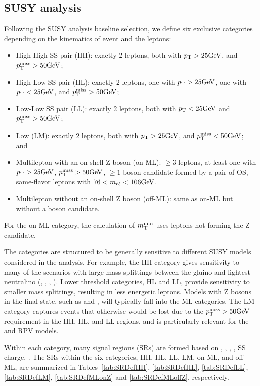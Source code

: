 \subsection{SUSY analysis}

Following the SUSY analysis baseline selection, we define 
six exclusive categories depending on the kinematics of event and the leptons:
\begin{itemize}
\item High-High SS pair (HH): exactly 2 leptons, both with $p_{\mathrm{T}}>25 \text{GeV}$, and $p_{\mathrm{T}}^\text{miss}>50 \text{GeV}$;
\item High-Low SS pair (HL): exactly 2 leptons, one with $p_{\mathrm{T}}>25 \text{GeV}$, one with $p_{\mathrm{T}}<25 \text{GeV}$, and $p_{\mathrm{T}}^\text{miss}>50 \text{GeV}$;
\item Low-Low SS pair (LL): exactly 2 leptons, both with $p_{\mathrm{T}}<25 \text{GeV}$ and $p_{\mathrm{T}}^\text{miss}>50 \text{GeV}$;
\item Low \ptmiss (LM): exactly 2 leptons, both with $p_{\mathrm{T}}>25 \text{GeV}$, and $p_{\mathrm{T}}^\text{miss}<50 \text{GeV}$; and
\item Multilepton with an on-shell Z boson (on-\PZ ML): $\geq$3 leptons, at least one with $p_{\mathrm{T}}>25 \text{GeV}$, $p_{\mathrm{T}}^\text{miss}>50 \text{GeV}$, $\geq 1$ \PZ boson candidate formed by a pair of OS, same-flavor leptons with $76 < m_{\ell\ell}< 106 \text{GeV}$.
\item Multilepton without an on-shell Z boson (off-\PZ ML): same as on-\PZ ML but without a \PZ boson candidate.
\end{itemize}

For the on-\PZ ML category, the calculation of $m_{\mathrm{T}}^{\text{min}}$ uses leptons not 
forming the Z candidate.

The categories are structured to be generally sensitive to different SUSY models
considered in the analysis. For example, the HH category gives sensitivity
to many of the scenarios with large mass splittings between the 
gluino and lightest neutralino (\Totttt, \TfttbbWW, \Tftttt, \TfqqqqWW).
Lower \pt threshold categories, HL and LL, provide sensitivity to smaller 
mass splittings, resulting in less energetic leptons. Models with
Z bosons in the final state, such as \TfqqqqWZ and \TsttHZ, will typically
fall into the ML categories. The LM category captures events that
otherwise would be lost due to the $p_{\mathrm{T}}^\text{miss}>50\text{GeV}$ requirement in the
HH, HL, and LL regions, and is particularly relevant for the 
\ToqqqqL and \Totbs RPV models.


Within each category, many signal regions (SRs) are formed based on 
\Njets, \Nbjets, \HT, \ptmiss, SS charge, \mtmin.
The SRs
within the six categories, HH, HL, LL, LM, on-\PZ ML, and off-\PZ ML,
are summarized in Tables~\ref{tab:SRDefHH}, \ref{tab:SRDefHL},
\ref{tab:SRDefLL}, \ref{tab:SRDefLM}, \ref{tab:SRDefMLonZ} and
\ref{tab:SRDefMLoffZ}, respectively. 

